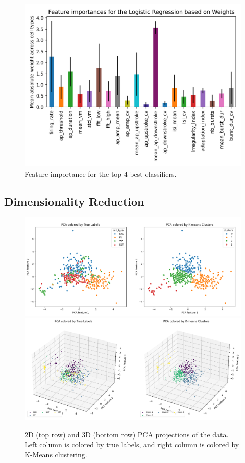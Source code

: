 \documentclass{IEEEtran}
\begin{document}
\begin{figure}[h!]
  \includegraphics[width=0.9\columnwidth]{figures/feature_importance_lr.png}
  \caption{Feature importance for the top 4 best classifiers.}%
  \label{fig:feature_importances}
\end{figure}

\subsection{Dimensionality Reduction}

\begin{figure}[h!]
  \centering
  \includegraphics[width=1\columnwidth]{figures/Compare PCA 2D.png}
  \includegraphics[width=1\columnwidth]{figures/Compare PCA 3D.png}
  \caption{2D (top row) and 3D (bottom row) PCA projections of the data. Left column is colored by true labels, and right column is colored by K-Means clustering.}%
  \label{fig:pca}
\end{figure}
\end{document}
